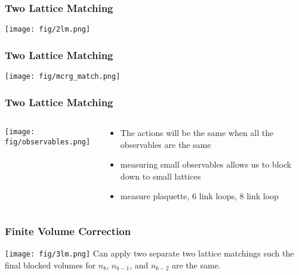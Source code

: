\documentclass{beamer}
\begin{document}
  \begin{frame}
    \frametitle{Two Lattice Matching}
    \centering
    \texttt{[image: fig/2lm.png]}
  \end{frame}

  \begin{frame}
    \frametitle{Two Lattice Matching}
    \centering
    \texttt{[image: fig/mcrg\_match.png]}
  \end{frame}

  \begin{frame}
    \frametitle{Two Lattice Matching}
    \begin{columns}[T]
      \begin{column}{.5\textwidth}
        \begin{block}{}
          \texttt{[image: fig/observables.png]}
        \end{block}
      \end{column}
      \begin{column}{.5\textwidth}
        \begin{block}{}
          \begin{itemize}
            \item The actions will be the same when all the observables are the same
            \item measuring small observables allows us to block down to small lattices
            \item measure plaquette, 6 link loops, 8 link loop
          \end{itemize}
        \end{block}
      \end{column}
    \end{columns}
  \end{frame}

  \begin{frame}
    \frametitle{Finite Volume Correction}
    \centering
    \texttt{[image: fig/3lm.png]}
    \vspace{12pt}
    Can apply two separate two lattice matchings such the final blocked volumes for $n_b$, $n_{b-1}$, and $n_{b-2}$ are the same.
  \end{frame}
\end{document}

